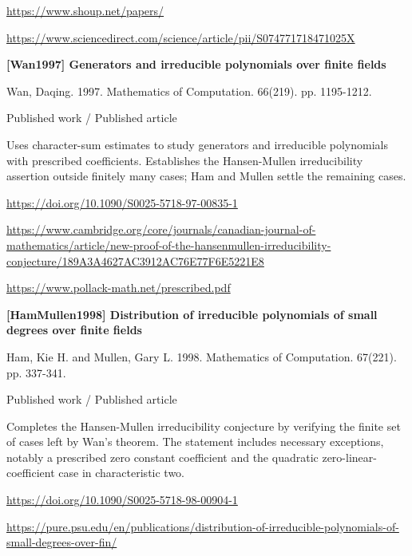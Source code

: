 \documentclass[11pt,a4paper,oneside,openany]{book}
\begin{document}
{\footnotesize\url{https://www.shoup.net/papers/}}\par
{\footnotesize\url{https://www.sciencedirect.com/science/article/pii/S074771718471025X}}\par
\vspace{9pt}
\hypertarget{ref:Wan1997}{}
{\sffamily\bfseries\color{atlasgreen}[Wan1997] Generators and irreducible polynomials over finite fields}\par
\color{black} Wan, Daqing. 1997. Mathematics of Computation. 66(219). pp. 1195-1212.\par
{\small\sffamily\color{atlasgold}Published work / Published article}\par
\color{black} Uses character-sum estimates to study generators and irreducible polynomials with prescribed coefficients. Establishes the Hansen-Mullen irreducibility assertion outside finitely many cases; Ham and Mullen settle the remaining cases.\par
{\footnotesize\url{https://doi.org/10.1090/S0025-5718-97-00835-1}}\par
{\footnotesize\url{https://www.cambridge.org/core/journals/canadian-journal-of-mathematics/article/new-proof-of-the-hansenmullen-irreducibility-conjecture/189A3A4627AC3912AC76E77F6E5221E8}}\par
{\footnotesize\url{https://www.pollack-math.net/prescribed.pdf}}\par
\vspace{9pt}
\hypertarget{ref:HamMullen1998}{}
{\sffamily\bfseries\color{atlasgreen}[HamMullen1998] Distribution of irreducible polynomials of small degrees over finite fields}\par
\color{black} Ham, Kie H. and Mullen, Gary L. 1998. Mathematics of Computation. 67(221). pp. 337-341.\par
{\small\sffamily\color{atlasgold}Published work / Published article}\par
\color{black} Completes the Hansen-Mullen irreducibility conjecture by verifying the finite set of cases left by Wan's theorem. The statement includes necessary exceptions, notably a prescribed zero constant coefficient and the quadratic zero-linear-coefficient case in characteristic two.\par
{\footnotesize\url{https://doi.org/10.1090/S0025-5718-98-00904-1}}\par
{\footnotesize\url{https://pure.psu.edu/en/publications/distribution-of-irreducible-polynomials-of-small-degrees-over-fin/}}\par
\end{document}
